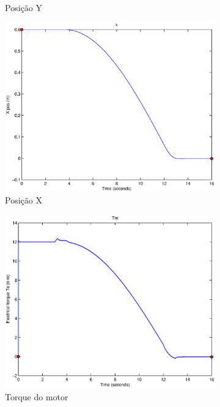 \documentclass{article}
\begin{document}
\begin{figure}[H]
\begin{subfigure}{0.32\textwidth}
		\caption{Posição Y}
	\end{subfigure}
	\begin{subfigure}{0.32\textwidth}
		\includegraphics[width=\linewidth]{matlab/x4}
		\caption{Posição X}
	\end{subfigure}
	\begin{subfigure}{0.32\textwidth}
		\includegraphics[width=\linewidth]{matlab/tm4}
		\caption{Torque do motor}
	\end{subfigure}
	\begin{subfigure}{0.32\textwidth}

\end{subfigure}
\end{figure}
\end{document}
